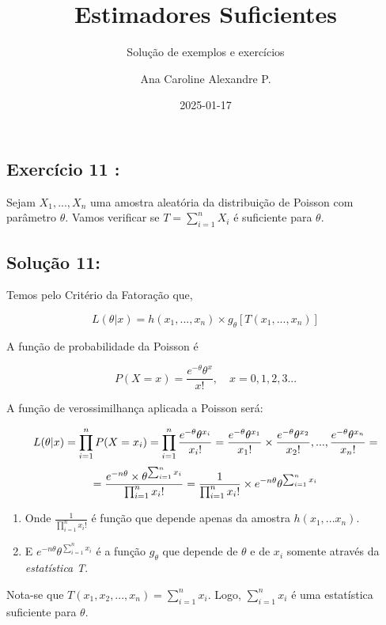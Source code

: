 \documentclass[
]{report}
\title{Estimadores Suficientes}
\subtitle{Solução de exemplos e exercícios}
\author{Ana Caroline Alexandre P.}
\date{2025-01-17}
\begin{document}
\maketitle


\subsection{Exercício 11 :}\label{exercuxedcio-11}

Sejam \(X_1,..., X_n\) uma amostra aleatória da distribuição de Poisson
com parâmetro \(θ\). Vamos verificar se \(T = \sum_{i=1}^{n} X_i\) é
suficiente para \(\theta\).

\subsection{Solução 11:}\label{soluuxe7uxe3o-11}

Temos pelo Critério da Fatoração que,

\[
L(\theta|x)= h(x_1,...,x_n)\times g_\theta[T(x_1,...,x_n)]
\]

A função de probabilidade da Poisson é

\[
P(X=x) = \frac{e^{-\theta}\theta^x}{x!} , \quad x=0,1,2,3...
\]

A função de verossimilhança aplicada a Poisson será:

\[L(\theta|x)=\prod_{i=1}^{n} P(X = x_i) = \prod_{i=1}^{n} \frac{e^{-\theta}\theta^{x_i}}{x_i!}
\\=\frac{e^{-\theta}\theta^{x_1}}{x_1!}\times\frac{e^{-\theta}\theta^{x_2}}{x_2!},...,\frac{e^{-\theta}\theta^{x_n}}{x_n!}=
\]
\[=\frac{e^{-n\theta}\times\theta^{\sum_{i=1}^{n}x_i}}{\prod_{i=1}^{n}x_i!}=\\
\frac{1}{\prod_{i=1}^{n}x_i!}\times{e^{-n\theta}\theta^{\sum_{i=1}^{n}x_i}}
\]

\begin{enumerate}
\def\labelenumi{\arabic{enumi}.}
\item
  Onde \(\frac{1}{\prod_{i=1}^{n}x_i!}\) é função que depende apenas da
  amostra \(h(x_1,...x_n)\).
\item
  E \({e^{-n\theta}\theta^{\sum_{i=1}^{n}x_i}}\) é a função \(g_\theta\)
  que depende de \(\theta\) e de \(x_i\) somente através da
  \emph{estatística T}.
\end{enumerate}

Nota-se que \(T(x_1,x_2,...,x_n)=\sum_{i = 1}^{n} x_{i}\). Logo,
\(\sum_{i = 1}^{n} x_{i}\) é uma estatística suficiente para \(\theta\).
\end{document}
